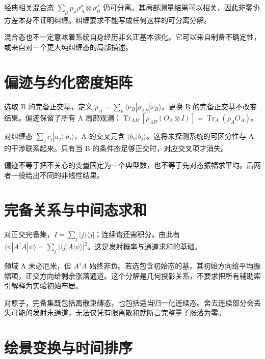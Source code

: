 \documentclass[UTF8,a4paper,zihao=-4,openany,fontset=fandol]{ctexbook}
\begin{document}
经典相关混合态 $\sum_\mu p_\mu\rho_A^\mu\otimes\rho_B^\mu$ 仍可分离。其局部测量结果可以相关，因此非零协方差本身不证明纠缠。纠缠要求不能写成任何这样的可分离分解。



混合态也不一定意味着系统自身经历非幺正基本演化。它可以来自制备不确定性，或来自对一个更大纯纠缠态的局部描述。



\section{偏迹与约化密度矩阵}\label{sec:A:3}


选取 B 的完备正交基，定义 $\rho_A=\sum_\nu\langle\nu_B|\rho_{AB}|\nu_B\rangle$。更换 B 的完备正交基不改变结果。偏迹保留了所有 A 局部观测：$\operatorname{Tr}_{AB}[\rho_{AB}(O_A\otimes I)]=\operatorname{Tr}_A(\rho_AO_A)$。



对纠缠态 $\sum_jc_j|a_j\rangle|b_j\rangle$，A 的交叉元含 $\langle b_k|b_j\rangle$。这将未探测系统的可区分性与 A 的干涉联系起来。只有当 B 的条件态足够正交时，对应交叉项才消失。



偏迹不等于把不关心的变量固定为一个典型数，也不等于先对态振幅求平均。后两者一般给出不同的非线性结果。



\section{完备关系与中间态求和}\label{sec:A:4}


对正交完备集，$I=\sum_j|j\rangle\langle j|$；连续谱还需积分。由此有 $\langle\psi|A^\dagger A|\psi\rangle=\sum_j|\langle j|A|\psi\rangle|^2$。这是发射概率与通道求和的基础。



频域 A 未必厄米，但 $A^\dagger A$ 始终非负。若选包含初始态的基，其初始方向给平均振幅项，正交方向给剩余涨落通道。这个分解是几何投影关系，不要求把所有辅助索引解释为实验初始布居。



对原子，完备集既包括离散束缚态，也包括适当归一化连续态。舍去连续部分会丢失可能的发射末通道，无法仅凭有限离散和就断言完整量子涨落为零。



\section{绘景变换与时间排序}\label{sec:A:5}
\end{document}
